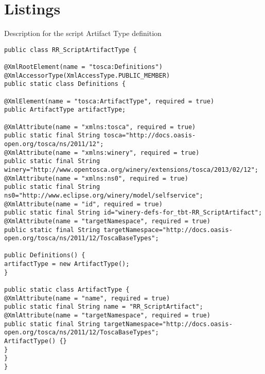 \allowdisplaybreaks
\chapter*{Listings}\label{chap:listing}
\begin{Listing} 
	\caption{Description for the script Artifact Type definition}
	\label{lst:scripttype}
\begin{lstlisting}
public class RR_ScriptArtifactType {

@XmlRootElement(name = "tosca:Definitions")
@XmlAccessorType(XmlAccessType.PUBLIC_MEMBER)
public static class Definitions {

@XmlElement(name = "tosca:ArtifactType", required = true)
public ArtifactType artifactType;

@XmlAttribute(name = "xmlns:tosca", required = true)
public static final String tosca="http://docs.oasis-open.org/tosca/ns/2011/12";
@XmlAttribute(name = "xmlns:winery", required = true)
public static final String winery="http://www.opentosca.org/winery/extensions/tosca/2013/02/12";
@XmlAttribute(name = "xmlns:ns0", required = true)
public static final String ns0="http://www.eclipse.org/winery/model/selfservice";
@XmlAttribute(name = "id", required = true)
public static final String id="winery-defs-for_tbt-RR_ScriptArtifact";
@XmlAttribute(name = "targetNamespace", required = true)
public static final String targetNamespace="http://docs.oasis-open.org/tosca/ns/2011/12/ToscaBaseTypes"; 

public Definitions() {
artifactType = new ArtifactType();
}

public static class ArtifactType {
@XmlAttribute(name = "name", required = true)
public static final String name = "RR_ScriptArtifact";
@XmlAttribute(name = "targetNamespace", required = true)
public static final String targetNamespace="http://docs.oasis-open.org/tosca/ns/2011/12/ToscaBaseTypes"; 
ArtifactType() {}
}
}
}
\end{lstlisting}
\end{Listing}

